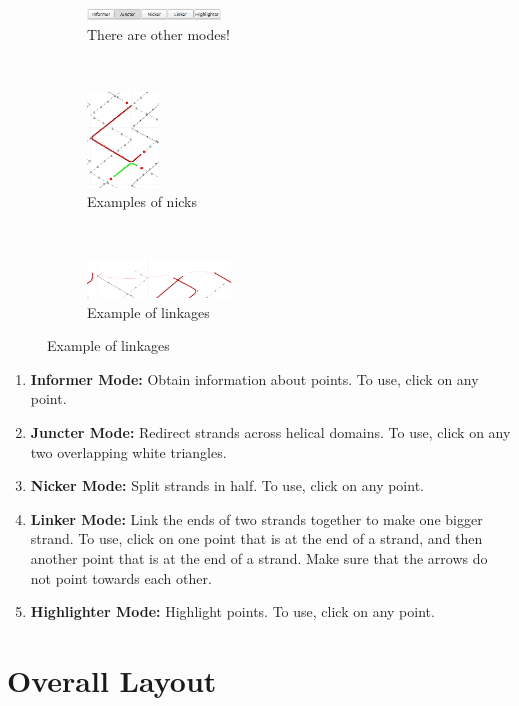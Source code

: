 \documentclass[titlepage]{article}
\begin{document}
	\begin{figure}[h]
		\caption{Advanced NATuG features}
		\centering
		\begin{subfigure}{.3\textwidth}
			\centering
			\includegraphics[width=1.4in]{juncter-activated.png}
			\caption{There are other modes!}
		\end{subfigure}%
		~
		\begin{subfigure}{.3\textwidth}
			\centering
			\includegraphics[height=1in]{nick-examples.png}
			\caption{Examples of nicks}
		\end{subfigure}%
		~
		\begin{subfigure}{.3\textwidth}
			\centering
			\includegraphics[width=1.5in]{linkage-example.png}
			\caption{Example of linkages}
		\end{subfigure}
	\end{figure}
	
	\begin{enumerate}
		\item \textbf{Informer Mode:} Obtain information about points. To use, click on any point.
		\item \textbf{Juncter Mode:} Redirect strands across helical domains. To use, click on any two overlapping white triangles.
		\item \textbf{Nicker Mode:} Split strands in half. To use, click on any point.
		\item \textbf{Linker Mode:} Link the ends of two strands together to make one bigger strand. To use, click on one point that is at the end of a strand, and then another point that is at the end of a strand. Make sure that the arrows do not point towards each other.
		\item \textbf{Highlighter Mode:} Highlight points. To use, click on any point.
	\end{enumerate}

	\newpage
	\section{Overall Layout}
	
\end{document}
